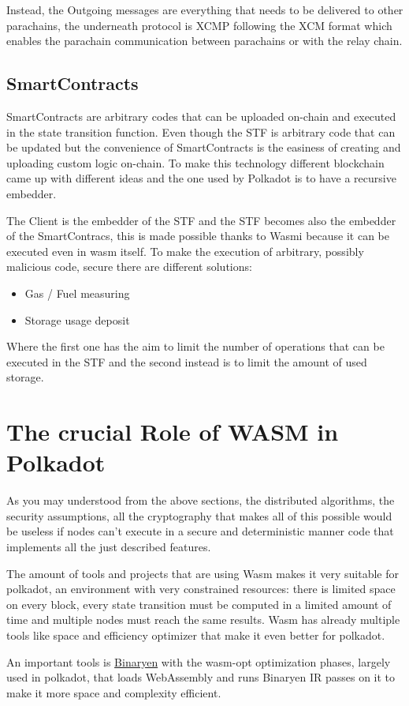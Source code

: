 Instead, the Outgoing messages are everything that needs to be delivered to other parachains, the underneath protocol is XCMP following the XCM format which enables the parachain communication between parachains or with the relay chain.

\subsection{SmartContracts}

SmartContracts are arbitrary codes that can be uploaded on-chain and executed in the state transition function. Even though the STF is arbitrary code that can be updated but the convenience of SmartContracts is the easiness of creating and uploading custom logic on-chain. To make this technology different blockchain came up with different ideas and the one used by Polkadot is to have a recursive embedder.

The Client is the embedder of the STF and the STF becomes also the embedder of the SmartContracs, this is made possible thanks to Wasmi because it can be executed even in wasm itself. To make the execution of arbitrary, possibly malicious code, secure there are different solutions:

\begin{itemize}
  \item Gas / Fuel measuring
  \item Storage usage deposit
\end{itemize}

Where the first one has the aim to limit the number of operations that can be executed in the STF and the second instead is to limit the amount of used storage.

\section{The crucial Role of WASM in Polkadot}

As you may understood from the above sections, the distributed algorithms, the security assumptions, all the cryptography that makes all of this possible would be useless if nodes can't execute in a secure and deterministic manner code that implements all the just described features.

The amount of tools and projects that are using Wasm makes it very suitable for polkadot, an environment with very constrained resources: there is limited space on every block, every state transition must be computed in a limited amount of time and multiple nodes must reach the same results. Wasm has already multiple tools like space and efficiency optimizer that make it even better for polkadot.

An important tools is \href{https://github.com/WebAssembly/binaryen}{Binaryen} with the wasm-opt optimization phases, largely used in polkadot, that loads WebAssembly and runs Binaryen IR passes on it to make it more space and complexity efficient.


